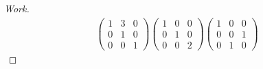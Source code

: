 \documentclass{article}
\begin{document}
\begin{proof}[Work]
\begin{align*}
\begin{pmatrix}
            1 & 3 & 0 \\
            0 & 1 & 0 \\
            0 & 0 & 1
        \end{pmatrix}
        \begin{pmatrix}
            1 & 0 & 0 \\
            0 & 1 & 0 \\
            0 & 0 & 2
        \end{pmatrix}
        \begin{pmatrix}
            1 & 0 & 0 \\
            0 & 0 & 1 \\
            0 & 1 & 0
        \end{pmatrix}
    \end{align*}
\end{proof}
\qdash
\end{document}
